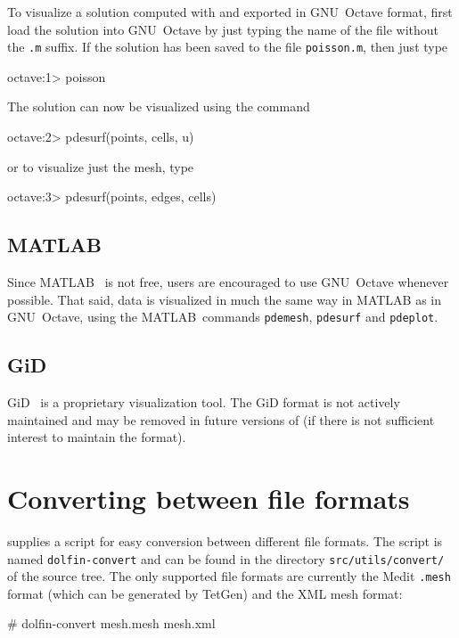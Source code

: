 To visualize a solution computed with \dolfin{} and exported in
GNU~Octave format, first load the solution into GNU~Octave by just
typing the name of the file without the \texttt{.m} suffix. If the
solution has been saved to the file \texttt{poisson.m}, then just type
\begin{code}
  octave:1> poisson
\end{code}
The solution can now be visualized using the command
\begin{code}
  octave:2> pdesurf(points, cells, u)
\end{code}
or to visualize just the mesh, type
\begin{code}
  octave:3> pdesurf(points, edges, cells)
\end{code}

\subsection{MATLAB}

Since MATLAB~\cite{www:MATLAB} is not free, users are encouraged to
use GNU~Octave whenever possible. That said, data is visualized in
much the same way in MATLAB as in GNU~Octave, using the
MATLAB~commands \texttt{pdemesh}, \texttt{pdesurf} and
\texttt{pdeplot}.

\subsection{GiD}

GiD~\cite{www:GiD} is a proprietary visualization tool.
The GiD format is not actively maintained and may be removed in
future versions of \dolfin{} (if there is not sufficient interest to
maintain the format).

\section{Converting between file formats}

\dolfin{} supplies a script for easy conversion between different file
formats.  The script is named \texttt{dolfin-convert} and can be found
in the directory \texttt{src/utils/convert/} of the \dolfin{} source
tree. The only supported file formats are currently the Medit
\texttt{.mesh} format (which can be generated by TetGen) and the
\dolfin{} XML mesh format:
\begin{code}
  # dolfin-convert mesh.mesh mesh.xml
\end{code}

